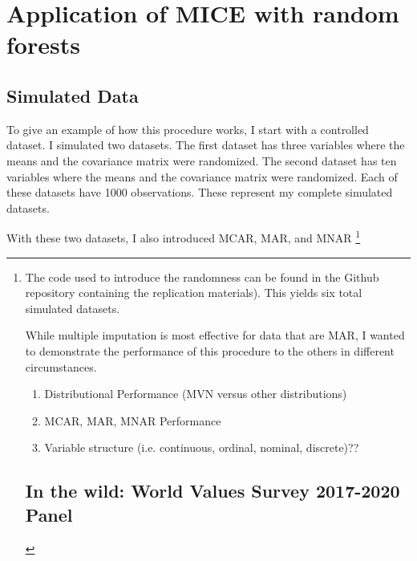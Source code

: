 \documentclass [12pt]{article}
\begin{document}
\section{Application of MICE with random forests}
	\subsection{Simulated Data}
	To give an example of how this procedure works, I start with a controlled dataset. I simulated two datasets. The first dataset has three variables where the means and the covariance matrix were randomized. The second dataset has ten variables where the means and the covariance matrix were randomized. Each of these datasets have 1000 observations. These represent my complete simulated datasets.
	
	With these two datasets, I also introduced MCAR, MAR, and MNAR \footnote{The code used to introduce the randomness can be found in the Github repository containing the replication materials). This yields six total simulated datasets. 
	
	While multiple imputation is most effective for data that are MAR, I wanted to demonstrate the performance of this procedure to the others in different circumstances.
	\begin{enumerate}
		\item Distributional Performance (MVN versus other distributions)
		\item MCAR, MAR, MNAR Performance
		\item Variable structure (i.e. continuous, ordinal, nominal, discrete)??
	\end{enumerate}
	\subsection{In the wild: World Values Survey 2017-2020 Panel}
}
\end{document}
